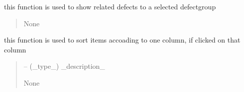 \documentclass[letterpaper,10pt,english]{sphinxmanual}
\begin{document}
\begin{savenotes}
\begin{fulllineitems}
\begin{savenotes}
\begin{fulllineitems}
\end{fulllineitems}\end{savenotes}


\begin{savenotes}\begin{fulllineitems}
\label{\detokenize{setting/setting_api:oxin.setting_api.API.show_related_defects}}
\pysigstartsignatures
{}
\pysigstopsignatures
\sphinxAtStartPar
this function is used to show related defects to a selected defect\sphinxhyphen{}group
\begin{quote}\begin{description}
\sphinxAtStartPar
None

\end{description}\end{quote}

\end{fulllineitems}\end{savenotes}


\begin{savenotes}\begin{fulllineitems}
\label{\detokenize{setting/setting_api:oxin.setting_api.API.tabledefectgroups_onHeaderClicked}}
\pysigstartsignatures
{}
\pysigstopsignatures
\sphinxAtStartPar
this function is used to sort items accoading to one column, if clicked on that column
\begin{quote}\begin{description}
\sphinxAtStartPar
{} – (\_type\_) \_description\_

\sphinxAtStartPar
None

\end{description}\end{quote}

\end{fulllineitems}\end{savenotes}


\end{fulllineitems}
\end{savenotes}
\end{document}

